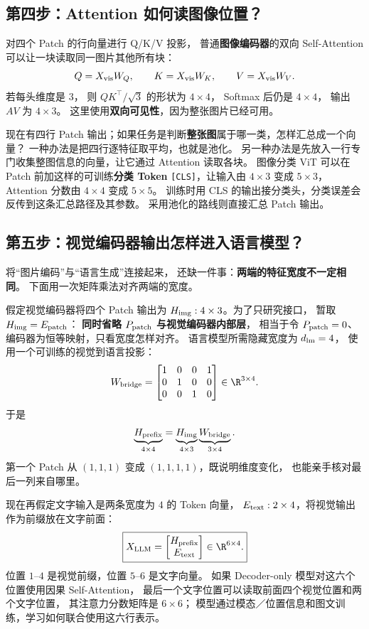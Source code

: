 \subsection{第四步：Attention 如何读图像位置？}

对四个 Patch 的行向量进行 Q/K/V 投影，
普通\textbf{图像编码器}的双向 Self-Attention
可以让一块读取同一图片其他所有块：
\[
Q=X_{\rm vis}W_Q,\qquad K=X_{\rm vis}W_K,\qquad V=X_{\rm vis}W_V.
\]
若每头维度是 $3$，
则 $QK^\top/\sqrt3$ 的形状为 $4\times4$，
Softmax 后仍是 $4\times4$，
输出 $AV$ 为 $4\times3$。
这里使用\textbf{双向可见性}，因为整张图片已经可用。

现在有四行 Patch 输出；如果任务是判断\textbf{整张图}属于哪一类，怎样汇总成一个向量？
一种办法是把四行逐特征取平均，也就是池化。
另一种办法是先放入一行专门收集整图信息的向量，让它通过 Attention 读取各块。
图像分类 ViT 可以在 Patch 前加这样的可训练\textbf{分类 Token}
\texttt{[CLS]}，让输入由 $4\times3$ 变成 $5\times3$，
Attention 分数由 $4\times4$ 变成 $5\times5$。
训练时用 CLS 的输出接分类头，分类误差会反传到这条汇总路径及其参数。
采用池化的路线则直接汇总 Patch 输出。

\subsection{第五步：视觉编码器输出怎样进入语言模型？}

将“图片编码”与“语言生成”连接起来，
还缺一件事：\textbf{两端的特征宽度不一定相同}。
下面用一次矩阵乘法对齐两端的宽度。

假定视觉编码器将四个 Patch 输出为
$H_{\rm img}:4\times3$。为了只研究接口，
暂取 $H_{\rm img}=E_{\rm patch}$：
\textbf{同时省略 $P_{\rm patch}$ 与视觉编码器内部层}，
相当于令 $P_{\rm patch}=0$、编码器为恒等映射，只看宽度怎样对齐。
语言模型所需隐藏宽度为 $d_{\rm lm}=4$，
使用一个可训练的视觉到语言投影：
\[
W_{\rm bridge}=
\begin{bmatrix}
1&0&0&1\\
0&1&0&0\\
0&0&1&0
\end{bmatrix}\in\R^{3\times4}.
\]
于是
\[
\underbrace{H_{\rm prefix}}_{4\times4}
=\underbrace{H_{\rm img}}_{4\times3}
\underbrace{W_{\rm bridge}}_{3\times4}.
\]
第一个 Patch 从 $(1,1,1)$ 变成
$(1,1,1,1)$，既说明维度变化，
也能亲手核对最后一列来自哪里。

现在再假定文字输入是两条宽度为 $4$ 的 Token 向量，
$E_{\rm text}:2\times4$，将视觉输出作为前缀放在文字前面：
\begin{equation}
\boxed{
X_{\rm LLM}=
\begin{bmatrix}H_{\rm prefix}\\E_{\rm text}\end{bmatrix}
\in\R^{6\times4}.}
\label{eq:vit-llm-bridge}
\end{equation}
位置 $1$--$4$ 是视觉前缀，位置 $5$--$6$ 是文字向量。
如果 Decoder-only 模型对这六个位置使用因果 Self-Attention，
最后一个文字位置可以读取前面四个视觉位置和两个文字位置，
其注意力分数矩阵是 $6\times6$；
模型通过模态／位置信息和图文训练，学习如何联合使用这六行表示。

